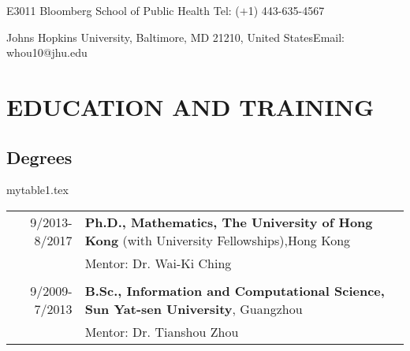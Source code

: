 \documentclass[10pt,letterpaper]{article}
\begin{document}
\begingroup
{}

\vspace{0.5cm}%
\centerline{{\hspace{5pt}E3011 Bloomberg School of Public Health }\hfill{Tel: ($+$1) 443-635-4567\hspace{5pt}}}
\centerline{{\hspace{5pt}Johns Hopkins University, Baltimore, MD 21210, United States}\hfill{Email: whou10@jhu.edu\hspace{5pt} }}
\endgroup\vspace{5pt}

\section*{EDUCATION AND TRAINING}
\subsection*{Degrees}
\begin{filecontents}{mytable1.tex}
\begin{longtable}{rX}
 9/2013-8/2017& \textbf{Ph.D., Mathematics, The University of Hong Kong} (with University Fellowships),Hong Kong\\
&Mentor: Dr. Wai-Ki Ching\\
&\\
9/2009-7/2013 &\textbf{B.Sc., Information and Computational Science, Sun Yat-sen University}, Guangzhou\\
 &Mentor: Dr. Tianshou Zhou\\
\end{longtable}
\end{filecontents}
\end{document}
